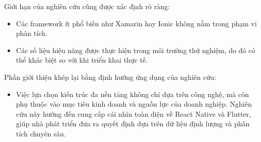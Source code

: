 \begin{flushleft}
    \hspace*{0.8cm}Giới hạn của nghiên cứu cũng được xác định rõ ràng:
    \setlength{\leftmargini}{1.0cm}
    \begin{itemize}
        \item Các framework ít phổ biến như Xamarin hay Ionic không nằm trong phạm vi phân tích.
        \item Các số liệu hiệu năng được thực hiện trong môi trường thử nghiệm, do đó có thể khác biệt so với khi triển khai thực tế.
    \end{itemize}
\end{flushleft}

\begin{flushleft}
    \hspace*{0.8cm}Phần giới thiệu khép lại bằng định hướng ứng dụng của nghiên cứu:
    \setlength{\leftmargini}{1.0cm}
    \begin{itemize}
        \item Việc lựa chọn kiến trúc đa nền tảng không chỉ dựa trên công nghệ, mà còn phụ thuộc vào mục tiêu kinh doanh và nguồn lực của doanh nghiệp. Nghiên cứu này hướng đến cung cấp cái nhìn toàn diện về React Native và Flutter, giúp nhà phát triển đưa ra quyết định dựa trên dữ liệu định lượng và phân tích chuyên sâu.
    \end{itemize}
\end{flushleft}
